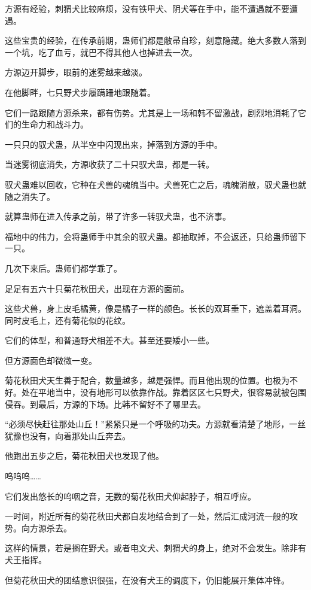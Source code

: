 \begin{this_body}
方源有经验，刺猬犬比较麻烦，没有铁甲犬、阴犬等在手中，能不遭遇就不要遭遇。

这些宝贵的经验，在传承前期，蛊师们都是敝帚自珍，刻意隐藏。绝大多数人落到一个坑，吃了血亏，就巴不得其他人也掉进去一次。

方源迈开脚步，眼前的迷雾越来越淡。

在他脚畔，七只野犬步履蹒跚地跟随着。

它们一路跟随方源杀来，都有伤势。尤其是上一场和韩不留激战，剧烈地消耗了它们的生命力和战斗力。

一只只的驭犬蛊，从半空中闪现出来，掉落到方源的手中。

当迷雾彻底消失，方源收获了二十只驭犬蛊，都是一转。

驭犬蛊难以回收，它种在犬兽的魂魄当中。犬兽死亡之后，魂魄消散，驭犬蛊也就随之消失了。

就算蛊师在进入传承之前，带了许多一转驭犬蛊，也不济事。

福地中的伟力，会将蛊师手中其余的驭犬蛊。都抽取掉，不会返还，只给蛊师留下一只。

几次下来后。蛊师们都学乖了。

足足有五六十只菊花秋田犬，出现在方源的面前。

这些犬兽，身上皮毛橘黄，像是橘子一样的颜色。长长的双耳垂下，遮盖着耳洞。同时皮毛上，还有菊花似的花纹。

它们的体型，和普通野犬相差不大。甚至还要矮小一些。

但方源面色却微微一变。

菊花秋田犬天生善于配合，数量越多，越是强悍。而且他出现的位置。也极为不好。处在平地当中，没有地形可以依靠作战。靠着区区七只野犬，很容易就被包围侵吞。到最后，方源的下场。比韩不留好不了哪里去。

“必须尽快赶往那处山丘！”紧紧只是一个呼吸的功夫。方源就看清楚了地形，一丝犹豫也没有，向着那处山丘奔去。

他跑出五步之后，菊花秋田犬也发现了他。

呜呜呜……

它们发出悠长的呜咽之音，无数的菊花秋田犬仰起脖子，相互呼应。

一时间，附近所有的菊花秋田犬都自发地结合到了一处，然后汇成河流一般的攻势。向方源杀去。

这样的情景，若是搁在野犬。或者电文犬、刺猬犬的身上，绝对不会发生。除非有犬王指挥。

但菊花秋田犬的团结意识很强，在没有犬王的调度下，仍旧能展开集体冲锋。


\end{this_body}
